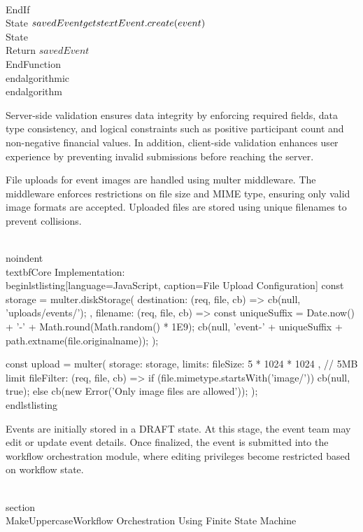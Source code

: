     \\EndIf
    \\State $savedEvent \\gets \\text{Event.create}(event)$
    \\State \\Return $savedEvent$
\\EndFunction
\\end{algorithmic}
\\end{algorithm}

Server-side validation ensures data integrity by enforcing required fields, data type consistency, and logical constraints such as positive participant count and non-negative financial values. In addition, client-side validation enhances user experience by preventing invalid submissions before reaching the server.

File uploads for event images are handled using multer middleware. The middleware enforces restrictions on file size and MIME type, ensuring only valid image formats are accepted. Uploaded files are stored using unique filenames to prevent collisions.

\\noindent\\textbf{Core Implementation:}
\\begin{lstlisting}[language=JavaScript, caption=File Upload Configuration]
const storage = multer.diskStorage({
  destination: (req, file, cb) => {
    cb(null, 'uploads/events/');
  },
  filename: (req, file, cb) => {
    const uniqueSuffix = Date.now() + '-' + Math.round(Math.random() * 1E9);
    cb(null, 'event-' + uniqueSuffix + path.extname(file.originalname));
  }
});

const upload = multer({ 
  storage: storage,
  limits: { fileSize: 5 * 1024 * 1024 }, // 5MB limit
  fileFilter: (req, file, cb) => {
    if (file.mimetype.startsWith('image/')) {
      cb(null, true);
    } else {
      cb(new Error('Only image files are allowed'));
    }
  }
});
\\end{lstlisting}

Events are initially stored in a DRAFT state. At this stage, the event team may edit or update event details. Once finalized, the event is submitted into the workflow orchestration module, where editing privileges become restricted based on workflow state.

\\section{\\MakeUppercase{Workflow Orchestration Using Finite State Machine}}

